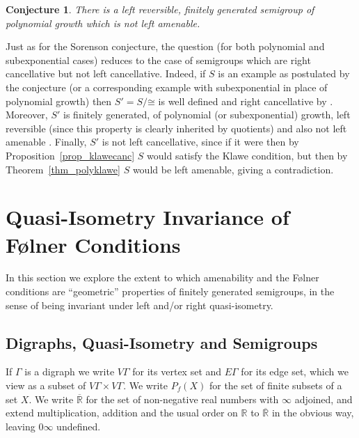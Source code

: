 \documentclass[11pt,a4paper,reqno]{amsart}
\newtheorem{conjecture}[theorem]{Conjecture}
\begin{document}
\begin{conjecture}
There is a left reversible, finitely generated semigroup of polynomial
growth which is not left amenable.
\end{conjecture}

Just as for the Sorenson conjecture, the question (for both polynomial
and subexponential cases) reduces to the case of semigroups which are
right cancellative but not left cancellative. Indeed, if $S$ is an
example as postulated by the conjecture (or a corresponding example with
subexponential in place of polynomial growth) then $S' = S / \mathord{\cong}$ is well defined
and right cancellative by \cite[Proposition~1.24]{Paterson88}. Moreover,
$S'$ is finitely generated, of polynomial (or subexponential) growth, left
reversible (since this property is clearly inherited by quotients) and
also not left amenable \cite[Proposition~1.25]{Paterson88}. Finally, $S'$ is not left cancellative,
since if it were then by Proposition~\ref{prop_klawecanc} $S$ would 
satisfy the Klawe condition, but then by Theorem~\ref{thm_polyklawe} $S$
would be left amenable, giving a contradiction.

\section{Quasi-Isometry Invariance of F\o lner Conditions}

In this section we explore the extent to which amenability and the
F\o lner conditions are ``geometric'' properties of finitely generated
semigroups, in the sense of being invariant under left and/or right
quasi-isometry.

\subsection{Digraphs, Quasi-Isometry and Semigroups}
If $\Gamma$ is a digraph we write $V\Gamma$ for its vertex
set and $E \Gamma$ for its edge set, which we view as a subset of
$V\Gamma \times V \Gamma$. We write $P_f(X)$ for the set of finite
subsets of a set $X$. We write $\mathbb{\overline{R}}$ for the set of
non-negative real numbers with $\infty$ adjoined, and extend multiplication,
addition and the usual order on $\mathbb{R}$ to $\mathbb{\overline{R}}$
in the obvious way, leaving $0 \infty$ undefined.
\end{document}

